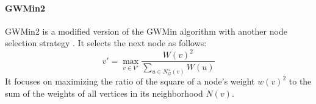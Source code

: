 \paragraph{GWMin2}
GWMin2 is a modified version of the GWMin algorithm with another node selection strategy \cite{SAKAI2003313}.
It selects the next node as follows:
\[
    v' = \max_{v \in V'} \frac{W(v)^2}{\sum_{u \in N_G^+(v)} W(u)}
\]
It focuses on maximizing the ratio of the square of a node's weight $w\left(v\right)^2$ to the sum of the weights of all vertices in its neighborhood $N\left(v\right)$.


